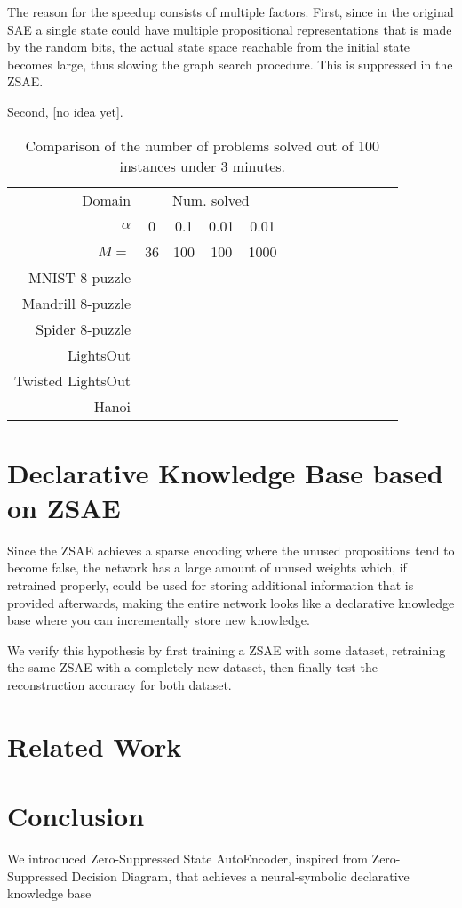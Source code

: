 The reason for the speedup consists of multiple factors.
First, since in the original SAE a single state could have multiple propositional representations
that is made by the random bits, the actual state space reachable from the initial state becomes large,
thus slowing the graph search procedure. This is suppressed in the ZSAE.

Second, [no idea yet].

\begin{table}
 \centering
 \begin{tabular}{|r|*{12}{c|}}
  Domain            & \multicolumn{4}{|c|}{Num. solved} \\
  $\alpha$          & 0  & 0.1 & 0.01 & 0.01 \\
  $M=$              & 36 & 100 & 100  & 1000 \\
  MNIST    8-puzzle & & & & \\
  Mandrill 8-puzzle & & & & \\
  Spider   8-puzzle & & & & \\
  LightsOut         & & & & \\
  Twisted LightsOut & & & & \\
  Hanoi             & & & & \\
 \end{tabular}
 \caption{Comparison of the number of problems solved out of 100 instances under 3 minutes.}
 \label{tab:planning}
\end{table}


\section{Declarative Knowledge Base based on ZSAE}

Since the ZSAE achieves a sparse encoding where the unused propositions
tend to become false, the network has a large amount of unused weights
which, if retrained properly, could be used for storing additional
information that is provided afterwards, making the entire network looks
like a declarative knowledge base where you can incrementally store
new knowledge.

We verify this hypothesis by first training a ZSAE with some dataset, retraining the same ZSAE with
a completely new dataset, then finally test the reconstruction accuracy for both dataset.

\section{Related Work}






\section{Conclusion}

We introduced Zero-Suppressed State AutoEncoder, inspired from Zero-Suppressed Decision Diagram,
that achieves a neural-symbolic declarative knowledge base 